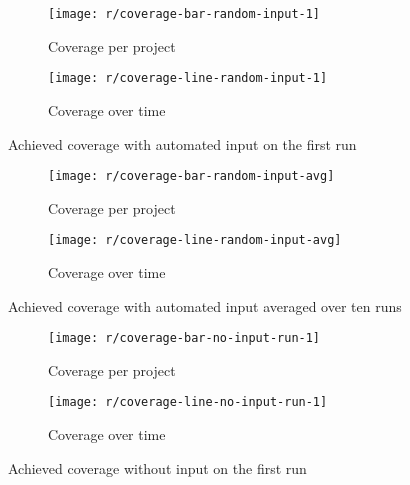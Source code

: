 \begin{figure}[htpb]
    \centering
    \begin{subfigure}{.95\textwidth}
        \texttt{[image: r/coverage-bar-random-input-1]}
        \caption{Coverage per project}
        \label{fig:coverage_bar}
    \end{subfigure}

    \bigskip

    \begin{subfigure}{.95\textwidth}
        \texttt{[image: r/coverage-line-random-input-1]}
        \caption{Coverage over time}
        \label{fig:coverage_line}
    \end{subfigure}

    \caption{Achieved coverage with automated input on the first run}
    \label{fig:coverage}
\end{figure}

\begin{figure}[htpb]
    \centering
    \begin{subfigure}{.95\textwidth}
        \texttt{[image: r/coverage-bar-random-input-avg]}
        \caption{Coverage per project}
        \label{fig:coverage_bar_avg}
    \end{subfigure}

    \bigskip

    \begin{subfigure}{.95\textwidth}
        \texttt{[image: r/coverage-line-random-input-avg]}
        \caption{Coverage over time}
        \label{fig:coverage_line_avg}
    \end{subfigure}

    \caption{Achieved coverage with automated input averaged over ten runs}
    \label{fig:coverage_avg}
\end{figure}

\begin{figure}[htpb]
    \centering
    \begin{subfigure}{.95\textwidth}
        \texttt{[image: r/coverage-bar-no-input-run-1]}
        \caption{Coverage per project}
        \label{fig:coverage_no_input_bar}
    \end{subfigure}

    \bigskip

    \begin{subfigure}{.95\textwidth}
        \texttt{[image: r/coverage-line-no-input-run-1]}
        \caption{Coverage over time}
        \label{fig:coverage_no_input_line}
    \end{subfigure}

    \caption{Achieved coverage without input on the first run}
    \label{fig:coverage_no_input}
\end{figure}

